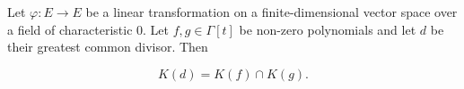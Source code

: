 Let $\varphi: E \to E$ be a linear transformation on a finite-dimensional vector space over a field of characteristic $0$. Let $f, g \in \Gamma[t]$ be non-zero polynomials and let $d$ be their greatest common divisor. Then

$$K(d) = K(f) \cap K(g).$$
